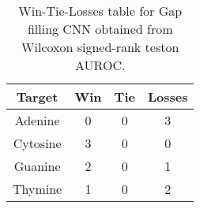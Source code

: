 \begin{table}[H]
\centering
\begin{tabular}{|c|c|c|c|}

\textbf{Target} &  \textbf{Win} &  \textbf{Tie} &  \textbf{Losses} \\
\hline

        Adenine &             0 &             0 &                3 \\
\hline
       Cytosine &             3 &             0 &                0 \\
\hline
        Guanine &             2 &             0 &                1 \\
\hline
        Thymine &             1 &             0 &                2 \\
\hline

\end{tabular}
\caption{Win-Tie-Losses table for Gap filling CNN obtained from Wilcoxon signed-rank teston AUROC.}
\label{tab:gap_filling_cnn_nucleotides_comparison}
\end{table}